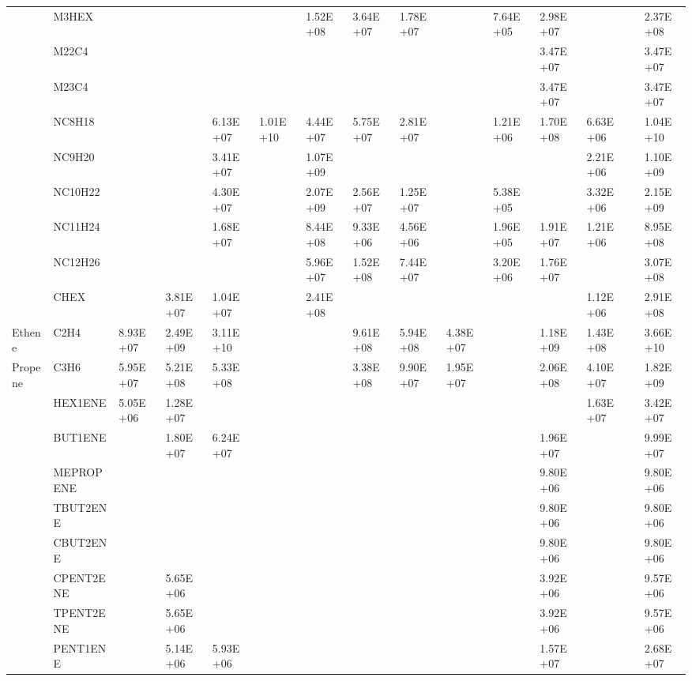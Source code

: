\begin{longtable}{lllllllllllllll}
	 & M3HEX &  &  &  &  & 1.52E+08 & 3.64E+07 & 1.78E+07 &  & 7.64E+05 & 2.98E+07 &  &  & 2.37E+08 \\
	 & M22C4 &  &  &  &  &  &  &  &  &  & 3.47E+07 &  &  & 3.47E+07 \\
	 & M23C4 &  &  &  &  &  &  &  &  &  & 3.47E+07 &  &  & 3.47E+07 \\
	 & NC8H18 &  &  & 6.13E+07 & 1.01E+10 & 4.44E+07 & 5.75E+07 & 2.81E+07 &  & 1.21E+06 & 1.70E+08 & 6.63E+06 &  & 1.04E+10 \\
	 & NC9H20 &  &  & 3.41E+07 &  & 1.07E+09 &  &  &  &  &  & 2.21E+06 &  & 1.10E+09 \\
	 & NC10H22 &  &  & 4.30E+07 &  & 2.07E+09 & 2.56E+07 & 1.25E+07 &  & 5.38E+05 &  & 3.32E+06 &  & 2.15E+09 \\
	 & NC11H24 &  &  & 1.68E+07 &  & 8.44E+08 & 9.33E+06 & 4.56E+06 &  & 1.96E+05 & 1.91E+07 & 1.21E+06 &  & 8.95E+08 \\
	 & NC12H26 &  &  &  &  & 5.96E+07 & 1.52E+08 & 7.44E+07 &  & 3.20E+06 & 1.76E+07 &  &  & 3.07E+08 \\
	 & CHEX &  & 3.81E+07 & 1.04E+07 &  & 2.41E+08 &  &  &  &  &  & 1.12E+06 &  & 2.91E+08 \\
	\hline Ethene & C2H4 & 8.93E+07 & 2.49E+09 & 3.11E+10 &  &  & 9.61E+08 & 5.94E+08 & 4.38E+07 &  & 1.18E+09 & 1.43E+08 &  & 3.66E+10 \\ \hline
	Propene & C3H6 & 5.95E+07 & 5.21E+08 & 5.33E+08 &  &  & 3.38E+08 & 9.90E+07 & 1.95E+07 &  & 2.06E+08 & 4.10E+07 &  & 1.82E+09 \\
	\hline \parbox[t]{2mm}{} & HEX1ENE & 5.05E+06 & 1.28E+07 &  &  &  &  &  &  &  &  & 1.63E+07 &  & 3.42E+07 \\
	 & BUT1ENE &  & 1.80E+07 & 6.24E+07 &  &  &  &  &  &  & 1.96E+07 &  &  & 9.99E+07 \\
	 & MEPROPENE &  &  &  &  &  &  &  &  &  & 9.80E+06 &  &  & 9.80E+06 \\
	 & TBUT2ENE &  &  &  &  &  &  &  &  &  & 9.80E+06 &  &  & 9.80E+06 \\
	 & CBUT2ENE &  &  &  &  &  &  &  &  &  & 9.80E+06 &  &  & 9.80E+06 \\
	 & CPENT2ENE &  & 5.65E+06 &  &  &  &  &  &  &  & 3.92E+06 &  &  & 9.57E+06 \\
	 & TPENT2ENE &  & 5.65E+06 &  &  &  &  &  &  &  & 3.92E+06 &  &  & 9.57E+06 \\
	 & PENT1ENE &  & 5.14E+06 & 5.93E+06 &  &  &  &  &  &  & 1.57E+07 &  &  & 2.68E+07 \\

\end{longtable}
